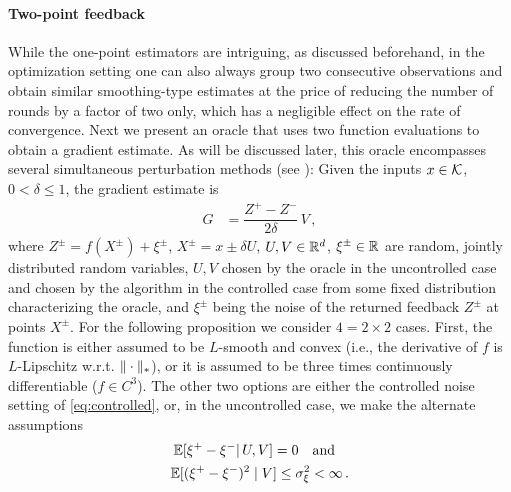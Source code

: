 \paragraph{Two-point feedback}
While the one-point estimators are intriguing, as discussed beforehand,
in the optimization setting one can also always group two consecutive observations and obtain similar smoothing-type estimates 
at the price of reducing the number of rounds by a factor of two only, which has a negligible effect on the rate of convergence.
Next we present an oracle that uses two function evaluations to obtain a gradient estimate.
As will be discussed later, this oracle encompasses several simultaneous perturbation methods (see \citealp{bhatnagar-book}):
Given the inputs $x\in \mathcal{K}$,  $0<\delta\le 1$,
the gradient estimate is
\begin{align}
G &=  \dfrac{Z^+ - Z^-}{2\delta}\, V \,, 
 \label{eq:twosp}
\end{align}
where $Z^{\pm} = f(X^{\pm}) + \xi^{\pm}$, $X^{\pm} = x \pm \delta U$, $U,V\in \mathbb{R}^d$, $\xi^{\pm}\in \mathbb{R}$ are random, jointly distributed random variables, $U,V$ chosen by the oracle in the uncontrolled case and chosen by the algorithm in the controlled case
from some fixed distribution characterizing the oracle, and $\xi^{\pm}$ being the noise of the returned feedback $Z^{\pm}$ at points $X^{\pm}$.
For the following proposition we consider $4=2\times 2$ cases.
First, the function is either assumed to be $L$-smooth and convex (i.e., the derivative of $f$ is $L$-Lipschitz w.r.t. $\|\cdot\|_*$), or it is assumed to be three times continuously differentiable ($f\in C^3$).
The other two options are either the controlled noise  setting of \eqref{eq:controlled}, or, in the uncontrolled case, we make the alternate assumptions
\begin{align}
\mathbb{E}[\xi^+-\xi^- |\, U,V] = 0 \text{~~ and ~~}\nonumber\\
\mathbb{E} [ (\xi^{+} - \xi^-)^{2} \mid V] \le \sigma_\xi^2 <\infty\,.
\label{eq:noiseass}
\end{align}

